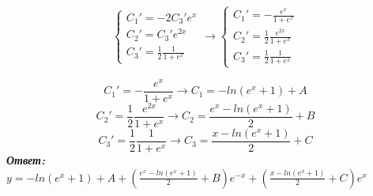 \documentclass[a5paper, 10pt]{article}
\theoremstyle{definition}
\theoremstyle{plain}
\theoremstyle{remark}
\begin{document}
\begin{equation}
\begin{cases}
C_1' = - 2C_3' e^{x}\\
C_2' = C_3' e^{2x}\\
 C_3'  = \frac{1}{2}\frac{1}{1+e^x}
\end{cases}
\to
\begin{cases}
C_1' = - \frac{e^x}{1+e^x}\\
C_2' = \frac{1}{2}\frac{ e^{2x}}{1+e^x}\\
C_3'  = \frac{1}{2}\frac{1}{1+e^x}
\end{cases}
\end{equation}

\begin{equation}
C_1' = - \frac{e^x}{1+e^x}  \to C_1 = -ln(e^x+1) + A
\end{equation}
\begin{equation}
C_2' = \frac{1}{2}\frac{ e^{2x}}{1+e^x}  \to C_2 = \frac{e^x - ln (e^x+1)}{2} + B
\end{equation}
\begin{equation}
C_3' = \frac{1}{2}\frac{1}{1+e^x} \to C_3 = \frac{x - ln(e^x+1)}{2} + C
\end{equation}
\textbf{\textit{Ответ:}}\\
$y = -ln(e^x+1) + A + \left(\frac{e^x - ln (e^x+1)}{2} + B  \right)e^{-x} + \left( \frac{x - ln(e^x+1)}{2} + C \right) e^{x}$
\end{document}
